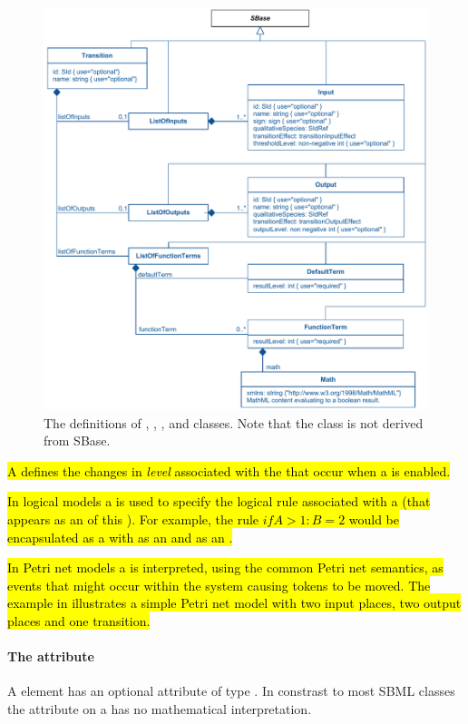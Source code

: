 \begin{figure}
  \includegraphics{figs/qual-transition-uml.pdf}
  \caption{The definitions of \Transition, \Input, \Output, \DefaultTerm and \FunctionTerm classes. Note that the \DefaultTerm class is not derived from SBase. }
  \label{qual-transition-uml}
\end{figure}

\hl{
A \Transition defines the changes in \emph{level} associated with the \QualitativeSpecies  that occur when a \Transition is enabled.  
}

\pagebreak

\hl{
In logical models a \Transition is used to specify the logical rule associated with a \QualitativeSpecies (that appears as an \Output of this \Transition). For example, the rule $if A > 1: B = 2$ would be encapsulated as a \Transition with \QualitativeSpecies {} as an \Input and  as an \Output.
}

\hl{In Petri net models a \Transition is interpreted, using the common Petri net semantics, as events that might occur within the system causing tokens to be moved. The example  in  illustrates a simple Petri net model with two input places, two output places and one transition.
}


\paragraph{The  attribute}
A \Transition element has an optional  attribute of type .  In constrast to most SBML classes the  attribute on a \Transition has no mathematical interpretation.

